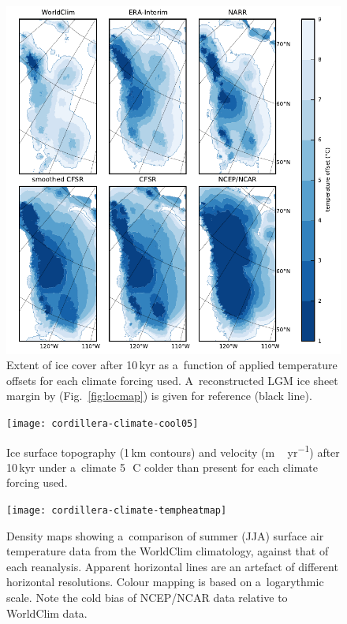 \documentclass[tc, ms]{copernicus}
\begin{document}
\begin{figure}
  \includegraphics{cordillera-climate-extent}
  \caption{Extent of ice cover after 10\,kyr as a~function of applied temperature offsets for each climate forcing used. A~reconstructed LGM ice sheet margin by \citet{dyke-2004} (Fig.~\ref{fig:locmap}) is given for reference (black line).}
  \label{fig:extent}
\end{figure}

\begin{figure}
  \texttt{[image: cordillera-climate-cool05]}
  \caption{Ice surface topography (1\,\unit{km} contours) and velocity (\unit{m\,yr^{-1}}) after 10\,kyr under a~climate 5\,\unit{{\degree}C} colder than present for each climate forcing used.}
  \label{fig:cool05}
\end{figure}

\begin{figure}
  \texttt{[image: cordillera-climate-tempheatmap]}
  \caption{Density maps showing a~comparison of summer (JJA) surface air temperature data from the WorldClim climatology, against that of each reanalysis. Apparent horizontal lines are an artefact of different horizontal resolutions. Colour mapping is based on a~logarythmic scale. Note the cold bias of NCEP/NCAR data relative to WorldClim data.}
  \label{fig:tempheatmap}
\end{figure}
\end{document}
